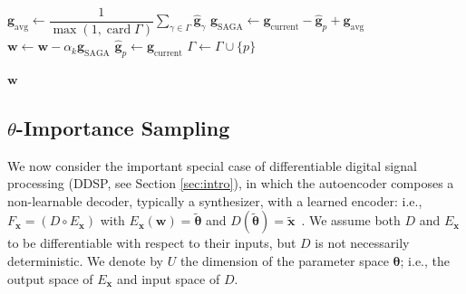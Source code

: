 \documentclass{article} %
\theoremstyle{plain}
\theoremstyle{definition}
\theoremstyle{remark}
\DeclareMathOperator{\Card}{card}
\begin{document}
\begin{algorithm}[t]
\begin{algorithmic}
    \colorbox{green!10}{
    \begin{minipage}{0.8\linewidth}
    \STATE $\boldsymbol{g}_{\mathrm{avg}} \leftarrow \dfrac{1}{\max(1,\Card\Gamma)} \sum_{\gamma\in\Gamma} \boldsymbol{\hat{g}}_\gamma$
    \STATE $\boldsymbol{g}_{\mathrm{SAGA}} \leftarrow \boldsymbol{g}_{\mathrm{current}} - \boldsymbol{\hat{g}}_p + \boldsymbol{g}_{\mathrm{avg}}$
    \STATE $\boldsymbol{w} \leftarrow \boldsymbol{w} - \alpha_k \boldsymbol{g}_{\mathrm{SAGA}}$
    \STATE $\boldsymbol{\hat{g}}_p \leftarrow \boldsymbol{g}_{\mathrm{current}}$
    \STATE $\Gamma \leftarrow \Gamma \cup \{ p \}$
    \end{minipage} 
    }
\ENDFOR
\RETURN $\boldsymbol{w}$
\end{algorithmic}
\end{algorithm}


\subsection{$\theta$-Importance Sampling}
\label{ssec:theta_importance_sampling}

We now consider the important special case of differentiable digital signal processing (DDSP, see Section \ref{sec:intro}), in which the autoencoder composes a non-learnable decoder, typically a synthesizer, with a learned encoder: i.e., $F_{\boldsymbol{x}} = (D\circ E_{\boldsymbol{x}})$ with $E_{\boldsymbol{x}}(\boldsymbol{w}) = \boldsymbol{\tilde{\theta}}$ and $D(\boldsymbol{\tilde{\theta}}) = \boldsymbol{\tilde{x}} $~\citep{engel2020ddsp}.
We assume both $D$ and $E_{\boldsymbol{x}}$ to be differentiable with respect to their inputs, but $D$ is not necessarily deterministic.
We denote by $U$ the dimension of the parameter space $\boldsymbol{\theta}$; i.e., the output space of $E_{\boldsymbol{x}}$ and input space of $D$.
\end{document}
